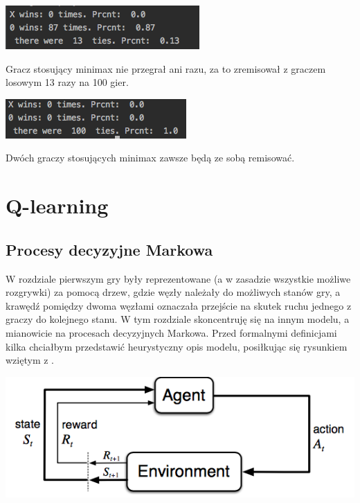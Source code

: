 \documentclass[licencjacka]{pracamgr}
\begin{document}
\begin{flushleft}
	\includegraphics [scale=0.6] {random_minimax.png}
\end{flushleft}

Gracz stosujący minimax nie przegrał ani razu, za to zremisował z graczem losowym 13 razy na 100 gier.

\begin{flushleft}
	\includegraphics [scale=0.6] {minimax_minimax.png}
\end{flushleft}
Dwóch graczy stosujących minimax zawsze będą ze sobą remisować. 

\chapter{Q-learning}\label{r:Tablica}

\section{Procesy decyzyjne Markowa}
W rozdziale pierwszym gry były reprezentowane (a w zasadzie wszystkie możliwe rozgrywki) za pomocą drzew, gdzie węzły należały do możliwych stanów gry, a krawędź pomiędzy dwoma węzłami oznaczała przejście na skutek ruchu jednego z graczy do kolejnego stanu. W tym rozdziale skoncentruję się na innym modelu, a mianowicie na procesach decyzyjnych Markowa.  Przed formalnymi definicjami kilka chciałbym przedstawić heurystyczny opis modelu, posiłkując się rysunkiem wziętym z \cite{RL}.\\

\begin{flushleft}
	\includegraphics [scale=0.6] {agent_env.png}
\end{flushleft}
\end{document}
